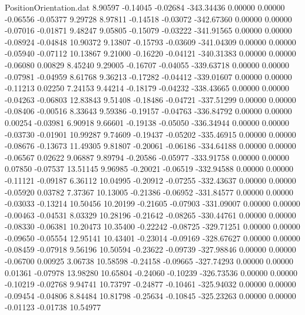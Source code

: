 \begin{filecontents}{PositionOrientation.dat}
   8.90597   -0.14045   -0.02684  -343.34436    0.00000    0.00000   -0.06556   -0.05377    9.29728
   8.97811   -0.14518   -0.03072  -342.67360    0.00000    0.00000   -0.07016   -0.01871    9.48247
   9.05805   -0.15079   -0.03222  -341.91565    0.00000    0.00000   -0.08924   -0.04848   10.90372
   9.13807   -0.15793   -0.03609  -341.04309    0.00000    0.00000   -0.05940   -0.07112   10.13867
   9.21000   -0.16220   -0.04121  -340.31383    0.00000    0.00000   -0.06080    0.00829    8.45240
   9.29005   -0.16707   -0.04055  -339.63718    0.00000    0.00000   -0.07981   -0.04959    8.61768
   9.36213   -0.17282   -0.04412  -339.01607    0.00000    0.00000   -0.11213    0.02250    7.24153
   9.44214   -0.18179   -0.04232  -338.43665    0.00000    0.00000   -0.04263   -0.06803   12.83843
   9.51408   -0.18486   -0.04721  -337.51299    0.00000    0.00000   -0.08406   -0.00516    8.33643
   9.59386   -0.19157   -0.04763  -336.84792    0.00000    0.00000    0.00254   -0.03981    6.90918
   9.66601   -0.19138   -0.05050  -336.34944    0.00000    0.00000   -0.03730   -0.01901   10.99287
   9.74609   -0.19437   -0.05202  -335.46915    0.00000    0.00000   -0.08676   -0.13673   11.49305
   9.81807   -0.20061   -0.06186  -334.64188    0.00000    0.00000   -0.06567    0.02622    9.06887
   9.89794   -0.20586   -0.05977  -333.91758    0.00000    0.00000    0.07850   -0.07537   13.51145
   9.96985   -0.20021   -0.06519  -332.94588    0.00000    0.00000   -0.11121   -0.09187    6.36112
  10.04995   -0.20912   -0.07255  -332.43637    0.00000    0.00000   -0.05920    0.03782    7.37367
  10.13005   -0.21386   -0.06952  -331.84577    0.00000    0.00000   -0.03033   -0.13214   10.50456
  10.20199   -0.21605   -0.07903  -331.09007    0.00000    0.00000   -0.00463   -0.04531    8.03329
  10.28196   -0.21642   -0.08265  -330.44761    0.00000    0.00000   -0.08330   -0.06381   10.20473
  10.35400   -0.22242   -0.08725  -329.71251    0.00000    0.00000   -0.09650   -0.05554   12.95141
  10.43401   -0.23014   -0.09169  -328.67627    0.00000    0.00000   -0.08459   -0.07918    9.56196
  10.50594   -0.23622   -0.09739  -327.98846    0.00000    0.00000   -0.06700    0.00925    3.06738
  10.58598   -0.24158   -0.09665  -327.74293    0.00000    0.00000    0.01361   -0.07978   13.98280
  10.65804   -0.24060   -0.10239  -326.73536    0.00000    0.00000   -0.10219   -0.02768    9.94741
  10.73797   -0.24877   -0.10461  -325.94032    0.00000    0.00000   -0.09454   -0.04806    8.84484
  10.81798   -0.25634   -0.10845  -325.23263    0.00000    0.00000   -0.01123   -0.01738   10.54977

\end{filecontents}
